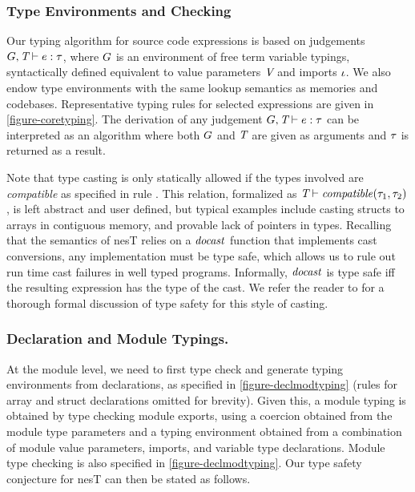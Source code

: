 \subsubsection{Type Environments and Checking} Our typing algorithm 
for source code expressions is based on judgements $G,\textit{T}
\vdash e : \tau$, where $G$ is an environment of free term variable
typings, syntactically defined equivalent to value parameters
$\textit{V}$ and imports $\iota$. We also endow type environments with
the same lookup semantics as memories and codebases.  Representative
typing rules for selected expressions are given in
\autoref{figure-coretyping}.  The derivation of any judgement
$G,\textit{T} \vdash e : \tau$ can be interpreted as an algorithm where
both $G$ and $\textit{T}$ are given as arguments and $\tau$ is returned
as a result.

Note that type casting is only statically allowed if the types
involved are \emph{compatible} as specified in rule .
This relation, formalized as $\textit{T} \vdash \mathit{compatible}(\tau_1,\tau_2)$,
is left abstract and user defined, but typical examples include
casting structs to arrays in contiguous memory, and provable lack of
pointers in types.  Recalling that the semantics of nesT relies on a
$\mathit{docast}$ function that implements cast conversions, any
implementation must be type safe, which allows us to rule out run time
cast failures in well typed programs. Informally, $\mathit{docast}$ is
type safe iff the resulting expression has the type of the cast.  We
refer the reader to \cite{FramedML} for a thorough formal discussion of
type safety for this style of casting.

\subsubsection{Declaration and Module Typings.} At the module level, 
we need to first type check and generate typing environments from
declarations, as specified in \autoref{figure-declmodtyping} (rules
for array and struct declarations omitted for brevity). Given this, a
module typing is obtained by type checking module exports, using a
coercion obtained from the module type parameters and a typing
environment obtained from a combination of module value parameters,
imports, and variable type declarations. Module type checking is also
specified in \autoref{figure-declmodtyping}. Our type safety conjecture 
for nesT can then be stated as follows.

